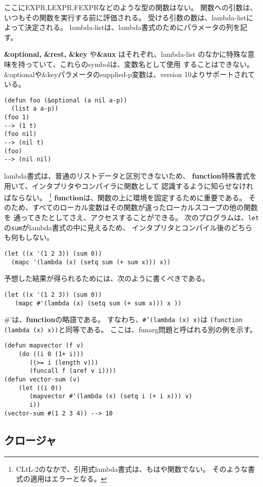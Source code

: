 ここにEXPR,LEXPR,FEXPRなどのような型の関数はない。
関数への引数は、いつもその関数を実行する前に評価される。
受ける引数の数は、lambda-listによって決定される。
lambda-listは、lambda書式のためにパラメータの列を記す。

{\bf \&optional, \&rest, \&key }や{\bf \&aux} はそれぞれ、lambda-list
のなかに特殊な意味を持っていて、これらのsymbolは、変数名として使用
することはできない。
\&optionalや\&keyパラメータのsupplied-p変数は、version 10よりサポートされている。

\begin{verbatim}
(defun foo (&optional (a nil a-p))
  (list a a-p))
(foo 1)
--> (1 t)
(foo nil)
--> (nil t)
(foo)
--> (nil nil)
\end{verbatim}

lambda書式は、普通のリストデータと区別できないため、
{\bf function}特殊書式を用いて、インタプリタやコンパイラに関数として
認識するように知らせなければならない。
\footnote{CLtL-2のなかで、引用式lambda書式は、もはや関数でない。
そのような書式の適用はエラーとなる。}
{\bf function}は、関数の上に環境を固定するために重要である。
そのため、すべてのローカル変数はその関数が違ったローカルスコープの他の関数を
通ってきたとしてさえ、アクセスすることができる。
次のプログラムは、{\tt let}の{\tt sum}がlambda書式の中に見えるため、
インタプリタとコンパイル後のどちらも何もしない。


\begin{verbatim}
(let ((x '(1 2 3)) (sum 0))
  (mapc '(lambda (x) (setq sum (+ sum x))) x))
\end{verbatim}

予想した結果が得られるためには、次のように書くべきである。
\begin{verbatim}
(let ((x '(1 2 3)) (sum 0))
   (mapc #'(lambda (x) (setq sum (+ sum x))) x ))
\end{verbatim}

\#'は、{\bf function}の略語である。
すなわち、{\tt \#'(lambda (x) x)}は
{\tt (function (lambda (x) x))}と同等である。
ここは、funarg問題と呼ばれる別の例を示す。

\begin{verbatim}
(defun mapvector (f v)
    (do ((i 0 (1+ i)))
       ((>= i (length v)))
       (funcall f (aref v i))))
(defun vector-sum (v)
    (let ((i 0))
       (mapvector #'(lambda (x) (setq i (+ i x))) v)
       i))
(vector-sum #(1 2 3 4)) --> 10 
\end{verbatim}

\subsection{クロージャ}

